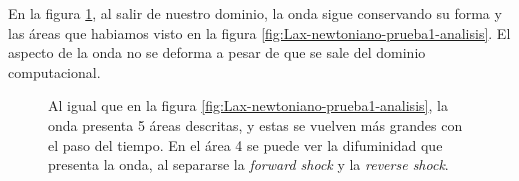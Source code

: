 \documentclass[12pt,a4paper]{book}
\begin{document}
En la figura \ref{fig:Lax-prueba2_no_centrado-analisis}, al salir de nuestro dominio, la onda sigue conservando su forma y las áreas que habiamos visto en la figura \ref{fig:Lax-newtoniano-prueba1-analisis}. El aspecto de la onda no se deforma a pesar de que se sale del dominio computacional.

\begin{figure}[H]
\centering
{}
\caption{\label{fig:Lax-prueba2_no_centrado-analisis}Al igual que en la figura \ref{fig:Lax-newtoniano-prueba1-analisis}, la onda presenta 5 áreas descritas, y estas se vuelven más grandes con el paso del tiempo. En el área 4 se puede ver la difuminidad que presenta la onda, al separarse la \emph{forward shock} y la \emph{reverse shock}.} 
\end{figure}
\end{document}
